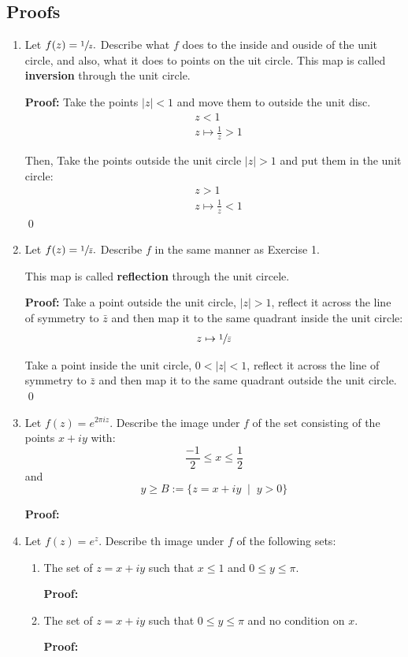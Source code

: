 \subsection{Proofs}
\begin{enumerate}
	\item Let $f(z) = \sfrac{1}{z}.$ Describe what $f$ does to the inside and ouside of the unit circle, 
	and also, what it does to points on the uit circle. This map is called \textbf{inversion} through the unit circle.
	
	\textbf{Proof:}
	Take the points $|z| < 1$ and move them to outside the unit disc.
	\begin{align*}
		&z < 1 \\
		&z \mapsto \frac{1}{z} > 1
	\end{align*}

	Then, Take the points outside the unit circle $|z| > 1$ and put them in the unit circle:
	\begin{align*}
		&z > 1 \\
		&z \mapsto \frac{1}{z} < 1
	\end{align*}
	\qed


	\item Let $f(z) = \sfrac{1}{\bar{z}}.$ Describe $f$ in the same manner as Exercise 1. 

	This map is called \textbf{reflection} through the unit circele.
	
	\textbf{Proof:}
	Take a point outside the unit circle, $|z| > 1$, reflect it across the line of symmetry to $\bar{z}$ and 
	then map it to the same quadrant inside the unit circle:
	\begin{align*}
		z \mapsto \sfrac{1}{\bar{z}} \\
	\end{align*}

	Take a point inside the unit circle, $0 < |z| < 1$, reflect it across the line of symmetry to $\bar{z}$ and 
	then map it to the same quadrant outside the unit circle. 
	\qed


	\item Let $f(z) = e^{2\pi iz}.$ Describe the image under $f$ of the set consisting of the points $x + iy$ with:
	\[ \frac{-1}{2} \leq x \leq \frac{1}{2} \]
	and
	\[ y \geq B := \{ z = x + iy \;\;|\;\; y > 0 \} \]

	\textbf{Proof:}

	

	\item Let $f(z) = e^z.$ Describe th image under $f$ of the following sets:
	
	\begin{enumerate}
		\item The set of $z = x + iy$ such that $x \leq 1$ and $0 \leq y \leq \pi.$
		
		\textbf{Proof:}

		\item The set of $z = x + iy$ such that $0 \leq y \leq \pi$ and no condition on $x.$
		
		\textbf{Proof:}

	\end{enumerate}
	
\end{enumerate}

